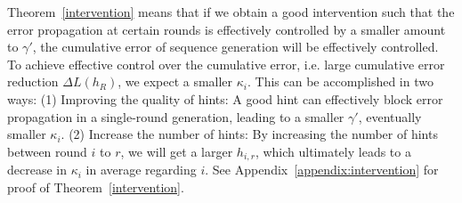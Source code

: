 Theorem~\ref{intervention} means that if we obtain a good intervention such that the error propagation at certain rounds is effectively controlled by a smaller amount to \(\gamma'\), the cumulative error of sequence generation will be effectively controlled. To achieve effective control over the cumulative error, i.e. large cumulative error reduction \(\Delta L(h_R)\), we expect a smaller \(\kappa_i\). This can be accomplished in two ways: (1) Improving the quality of hints: A good hint can effectively block error propagation in a single-round generation, leading to a smaller \(\gamma'\), eventually smaller \(\kappa_i\). (2) Increase the number of hints: By increasing the number of hints between round \(i\) to \(r\), we will get a larger \(h_{i,r}\), which ultimately leads to a decrease in \(\kappa_i\) in average regarding \(i\). See Appendix~\ref{appendix:intervention} for proof of Theorem~\ref{intervention}.


